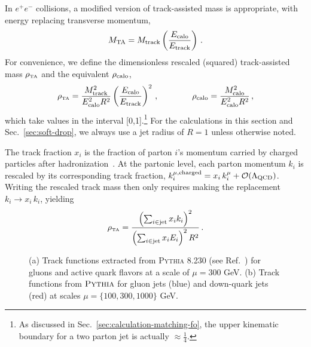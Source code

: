 \documentclass[letterpaper,11pt]{article}
\newcommand{\Ref}[1]{Ref.~\cite{#1}}
\newcommand{\Sec}[1]{Sec.~\ref{#1}}
\begin{document}


In $e^+e^-$ collisions, a modified version of track-assisted mass is appropriate, with energy replacing transverse momentum, 
\begin{equation}
M_{\rm TA} = M_{\rm track}\left(\frac{E_{\rm calo}}{E_{\rm track}}\right) \,.
\end{equation}
For convenience, we define the dimensionless rescaled (squared) track-assisted mass $\rho_{\mbox{\tiny TA}}$ and the equivalent $\rho_{\rm calo}$,
\begin{equation}\label{eq:obs-ee-def}
\rho_{\mbox{\tiny TA}} = \frac{M_{\text{track}}^2}{E_{\rm calo}^2R^2} \left(\frac{E_{\rm calo}}{E_{\rm track}}\right)^2\,,\qquad\qquad \rho_{\rm calo} = \frac{M_{\rm calo}^2}{E_{\rm calo}^2R^2}\,,
\end{equation}
which take values in the interval [0,1].\footnote{As discussed in \Sec{sec:calculation-matching-fo}, the upper kinematic boundary for a two parton jet is actually $\approx \frac{1}{4}$.}
%
For the calculations in this section and \Sec{sec:soft-drop}, we always use a jet radius of $R=1$ unless otherwise noted. 

The track fraction $x_i$ is the fraction of parton $i$'s momentum carried by charged particles after hadronization~\cite{Larkoski:2014pca,Chang:2013iba}. 
%
At the partonic level, each parton momentum $k_i$ is rescaled by its corresponding track fraction, $k_i^{\mu,\rm charged} = x_i \, k_i^\mu + \mathcal{O}(\Lambda_{\rm QCD})$. 
%
Writing the rescaled track mass then only requires making the replacement $k_i \rightarrow x_i \, k_i$, yielding
\begin{equation}
\rho_{\mbox{\tiny TA}} = \frac{\left(\sum_{i\in \text{jet}} x_i k_i\right)^2}{\left(\sum_{i\in \text{jet}} x_i E_i\right)^2R^2}\,.
\end{equation}

\begin{figure}
	\centering
	\caption{\label{fig:track-functions}  (a) Track functions extracted from \textsc{Pythia} 8.230 (see \Ref{Elder:2017bkd}) for gluons and active quark flavors at a scale of $\mu = 300$ GeV.  (b) Track functions from $\textsc{Pythia}$ for gluon jets (blue) and down-quark jets (red) at scales $\mu = \{100, 300, 1000\}$ GeV.}
\end{figure}
\end{document}
